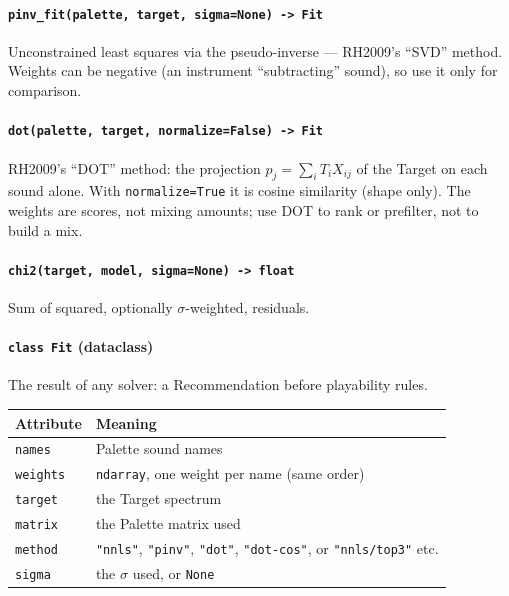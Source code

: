 \documentclass[
  10pt,
]{article}
\begin{document}
\paragraph{\texorpdfstring{\texttt{pinv\_fit(palette,\ target,\ sigma=None)\ -\textgreater{}\ Fit}}{pinv\_fit(palette, target, sigma=None) -\textgreater{} Fit}}

Unconstrained least squares via the pseudo-inverse ---
RH2009's ``SVD'' method. Weights can be negative (an
instrument ``subtracting'' sound), so use it only for
comparison.

\paragraph{\texorpdfstring{\texttt{dot(palette,\ target,\ normalize=False)\ -\textgreater{}\ Fit}}{dot(palette, target, normalize=False) -\textgreater{} Fit}}

RH2009's ``DOT'' method: the projection \mbox{$p_j = \sum_i T_i X_{ij}$} of
the Target on each sound alone. With \texttt{normalize=True}
it is cosine similarity (shape only). The weights are
scores, not mixing amounts; use DOT to rank or prefilter,
not to build a mix.

\paragraph{\texorpdfstring{\texttt{chi2(target,\ model,\ sigma=None)\ -\textgreater{}\ float}}{chi2(target, model, sigma=None) -\textgreater{} float}}

Sum of squared, optionally $\sigma$-weighted, residuals.

\paragraph{\texorpdfstring{\texttt{class\ Fit}
(dataclass)}{class Fit (dataclass)}}

The result of any solver: a Recommendation before
playability rules.

\begin{longtable}[]{@{}ll@{}}
\toprule
Attribute & Meaning\tabularnewline
\midrule
\endhead
\texttt{names} & Palette sound names\tabularnewline
\texttt{weights} & \texttt{ndarray}, one weight per name
(same order)\tabularnewline
\texttt{target} & the Target spectrum\tabularnewline
\texttt{matrix} & the Palette matrix used\tabularnewline
\texttt{method} & \texttt{"nnls"}, \texttt{"pinv"},
\texttt{"dot"}, \texttt{"dot-cos"}, or \texttt{"nnls/top3"}
etc.\tabularnewline
\texttt{sigma} & the $\sigma$ used, or \texttt{None}\tabularnewline
\bottomrule
\end{longtable}
\end{document}

